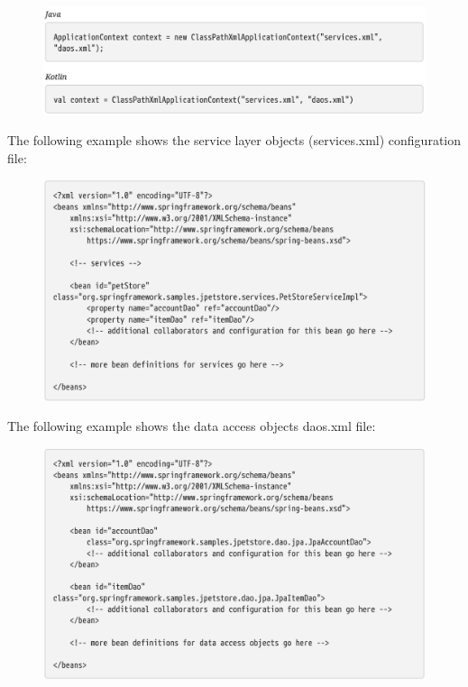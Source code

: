 \begin{figure}[ht]
    \centering
    \includegraphics[width=1\linewidth]{./Figure/IMG_code_2.png}
  \end{figure}

The following example shows the service layer objects (services.xml) configuration file:

\begin{figure}[ht]
\centering
\includegraphics[width=1\linewidth]{./Figure/IMG_code_3.png}
\end{figure}

\newpage
The following example shows the data access objects daos.xml file:

\begin{figure}[ht]
\centering
\includegraphics[width=1\linewidth]{./Figure/IMG_code_4.png}
\end{figure}

